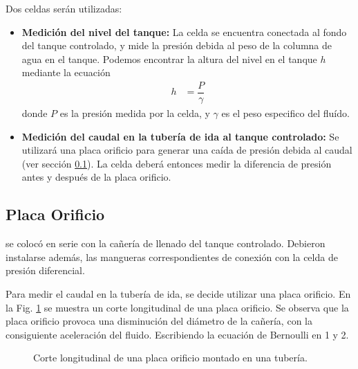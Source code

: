 Dos celdas serán utilizadas:
\begin{itemize}
 \item \textbf{Medición del nivel del tanque:} La celda se encuentra conectada
 al fondo del tanque controlado, y mide la presión debida al peso
 de la columna de agua en el tanque. 
 Podemos encontrar la altura del nivel en el tanque $h$ mediante la ecuación
 \begin{align}
  h &= \dfrac{P}{\gamma}
 \end{align}
donde $P$ es la presión medida por la celda, y $\gamma$ es el peso especifico
del fluído.
\item \textbf{Medición del caudal en la tubería de ida al tanque controlado:}
Se utilizará una placa orificio para generar una caída de presión debida al 
caudal (ver sección \ref{subsec:PlacaOrificio}). 
La celda deberá entonces medir la diferencia de presión antes y después
de la placa orificio.
\end{itemize}

\subsection{Placa Orificio}
\label{subsec:PlacaOrificio}
  se colocó en serie con la cañería de llenado del tanque controlado.
  Debieron instalarse además, las mangueras correspondientes de conexión 
  con la celda de presión diferencial.

Para medir el caudal en la tubería de ida, se decide
utilizar una placa orificio.
En la Fig. \ref{fig:placaOrificio} se muestra un corte longitudinal de una placa
orificio.
Se observa que la placa orificio provoca una disminución del diámetro
de la cañería, con la consiguiente aceleración del fluido.
Escribiendo la ecuación de Bernoulli en 1 y 2.

\begin{figure}
 \centering
 \caption{Corte longitudinal de una placa orificio montado en una tubería.}
 \label{fig:placaOrificio}
\end{figure}

